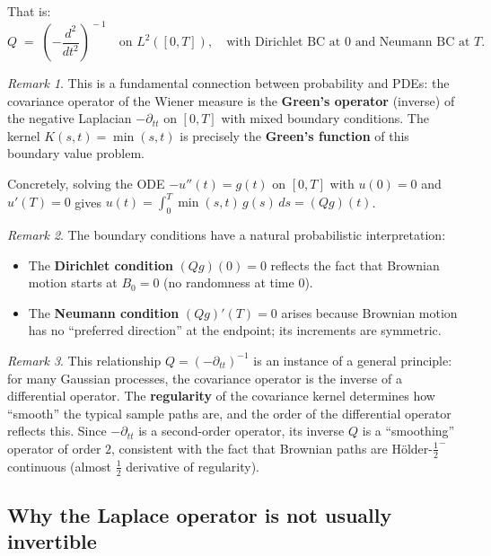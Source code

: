 \documentclass[11pt]{article}
\theoremstyle{definition}
\theoremstyle{remark}
\newtheorem{remark}{Remark}
\begin{document}
That is:
\[
    Q \;=\; \left(-\frac{d^2}{dt^2}\right)^{\!-1}
    \quad
    \text{on } L^2([0,T]),
    \quad
    \text{with Dirichlet BC at } 0
    \text{ and Neumann BC at } T.
\]

\begin{remark}
This is a fundamental connection between probability and PDEs:
the covariance operator of the Wiener measure is the
\textbf{Green's operator} (inverse) of the negative Laplacian
$-\partial_{tt}$ on $[0,T]$ with mixed boundary conditions.
The kernel $K(s,t) = \min(s,t)$ is precisely the \textbf{Green's
function} of this boundary value problem.

Concretely, solving the ODE $-u''(t) = g(t)$ on $[0,T]$
with $u(0) = 0$ and $u'(T) = 0$ gives
$u(t) = \int_0^T \min(s,t)\,g(s)\,ds = (Qg)(t)$.
\end{remark}

\begin{remark}
The boundary conditions have a natural probabilistic interpretation:
\begin{itemize}
    \item The \textbf{Dirichlet condition} $(Qg)(0) = 0$ reflects
          the fact that Brownian motion starts at $B_0 = 0$
          (no randomness at time $0$).
    \item The \textbf{Neumann condition} $(Qg)'(T) = 0$ arises because
          Brownian motion has no ``preferred direction'' at the endpoint;
          its increments are symmetric.
\end{itemize}
\end{remark}

\begin{remark}
This relationship $Q = (-\partial_{tt})^{-1}$ is an instance
of a general principle: for many Gaussian processes, the covariance
operator is the inverse of a differential operator.
The \textbf{regularity} of the covariance kernel determines how
``smooth'' the typical sample paths are, and the order of the
differential operator reflects this.
Since $-\partial_{tt}$ is a second-order operator, its inverse $Q$
is a ``smoothing'' operator of order $2$, consistent with the fact
that Brownian paths are H\"older-$\tfrac{1}{2}^{-}$ continuous
(almost $\tfrac{1}{2}$ derivative of regularity).
\end{remark}

\subsection*{Why the Laplace operator is not usually invertible}
\end{document}
